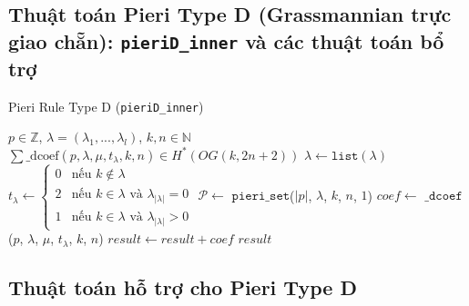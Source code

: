
\subsection*{Thuật toán Pieri Type D (Grassmannian trực giao chẵn): \texttt{pieriD\_inner} và các thuật toán bổ trợ}

\begin{algorithm}[H]
\caption{Pieri Rule Type D (\texttt{pieriD\_inner})}
\begin{algorithmic}[1]
\REQUIRE $p \in \mathbb{Z}$, $\lambda = (\lambda_1, ..., \lambda_l)$, $k, n \in \mathbb{N}$
\ENSURE $\sum \text{\_dcoef}(p,\lambda,\mu,t_\lambda,k,n) \in H^*(OG(k,2n+2))$
\STATE $\lambda \gets \mathtt{list}(\lambda)$
\STATE $t_\lambda \gets \begin{cases}
0 & \text{nếu } k \notin \lambda \\
2 & \text{nếu } k \in \lambda \text{ và } \lambda_{|\lambda|} = 0 \\
1 & \text{nếu } k \in \lambda \text{ và } \lambda_{|\lambda|} > 0
\end{cases}$
\STATE $\mathcal{P} \gets$ $\mathtt{pieri\_set}$($|p|$, $\lambda$, $k$, $n$, $1$)
    \STATE $coef \gets$ $\mathtt{\_dcoef}$($p$, $\lambda$, $\mu$, $t_\lambda$, $k$, $n$)
    \STATE $result \gets result + coef$
\ENDFOR
\RETURN $result$
\end{algorithmic}
\end{algorithm}

\subsection*{Thuật toán hỗ trợ cho Pieri Type D}

